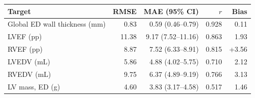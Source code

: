 \label{tab:high_impact_transition_results}
\begin{tabularx}{\linewidth}{@{}Yrrrr@{}}
\toprule
\textbf{Target} & \textbf{RMSE} & \textbf{MAE (95\% CI)} & \textbf{$r$} & \textbf{Bias}\\
\midrule
Global ED wall thickness (mm) & 0.83 & 0.59 (0.46--0.79) & 0.928 & \textminus{}0.11\\
LVEF (pp) & 11.38 & 9.17 (7.52--11.16) & 0.863 & \textminus{}1.93\\
RVEF (pp) & 8.87 & 7.52 (6.33--8.91) & 0.815 & +3.56\\
LVEDV (mL) & 5.86 & 4.88 (4.02--5.75) & 0.710 & \textminus{}2.12\\
RVEDV (mL) & 9.75 & 6.37 (4.89--9.19) & 0.766 & \textminus{}3.13\\
LV mass, ED (g) & 4.60 & 3.83 (3.17--4.58) & 0.517 & \textminus{}1.46\\
\bottomrule
\end{tabularx}
